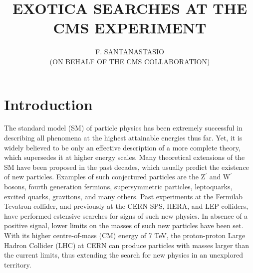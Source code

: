 \documentclass[11pt]{article}
\def\pp{proton-proton\xspace}
\def\Zprime{Z$^\prime$\xspace}
\def\Wprime{W$^\prime$\xspace}
\begin{document}
\vspace*{4cm}
\title{EXOTICA SEARCHES AT THE CMS EXPERIMENT}

\author{F. SANTANASTASIO \\(ON BEHALF OF THE CMS COLLABORATION)}

\address{University of Maryland, Department of Physics - John S. Toll Physics Building, \\ College Park, MD 20742-4111, United States of America}

\maketitle{}

\section{Introduction}
The standard model (SM) of particle physics has been extremely
successful in describing all phenomena at the highest 
attainable energies thus far. Yet, it is widely believed 
to be only an effective description of a more complete theory, 
which supersedes it at higher energy scales. Many theoretical 
extensions of the SM have been proposed in the past decades, 
which usually predict the existence of new particles. Examples 
of such conjectured particles are the \Zprime and \Wprime bosons, 
fourth generation fermions, supersymmetric particles, leptoquarks, 
excited quarks, gravitons, and many others.
Past experiments at the Fermilab Tevatron collider, 
and previously at the CERN SPS, HERA, and LEP colliders, 
have performed estensive searches for signs 
of such new physics. In absence of a positive signal, lower 
limits on the masses of such new particles have been set. 
With its higher centre-of-mass (CM) energy of 7 TeV, the \pp Large Hadron 
Collider (LHC) at CERN can produce particles with 
masses larger than the current limits, thus extending 
the search for new physics in an unexplored territory.
\end{document}
